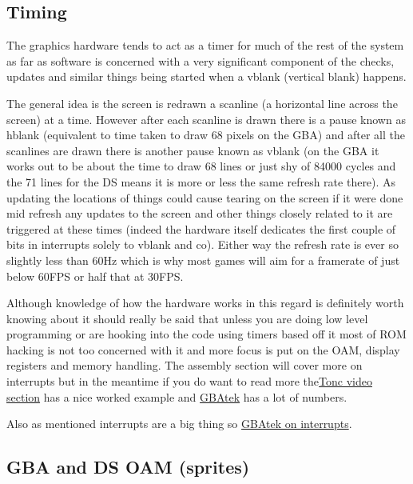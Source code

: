 \documentclass[
]{book}
\begin{document}
\hypertarget{timing}{%
\subsection{Timing}\label{timing}}

The graphics hardware tends to act as a timer for much of the rest of the system as far as software is concerned with a very significant component of the checks, updates and similar things being started when a vblank (vertical blank) happens.

The general idea is the screen is redrawn a scanline (a horizontal line across the screen) at a time. However after each scanline is drawn there is a pause known as hblank (equivalent to time taken to draw 68 pixels on the GBA) and after all the scanlines are drawn there is another pause known as vblank (on the GBA it works out to be about the time to draw 68 lines or just shy of 84000 cycles and the 71 lines for the DS means it is more or less the same refresh rate there). As updating the locations of things could cause tearing on the screen if it were done mid refresh any updates to the screen and other things closely related to it are triggered at these times (indeed the hardware itself dedicates the first couple of bits in interrupts solely to vblank and co). Either way the refresh rate is ever so slightly less than 60Hz which is why most games will aim for a framerate of just below 60FPS or half that at 30FPS.

Although knowledge of how the hardware works in this regard is definitely worth knowing about it should really be said that unless you are doing low level programming or are hooking into the code using timers based off it most of ROM hacking is not too concerned with it and more focus is put on the OAM, display registers and memory handling. The assembly section will cover more on interrupts but in the meantime if you do want to read more the\href{http://www.coranac.com/tonc/text/video.htm}{Tonc video section} has a nice worked example and \href{http://problemkaputt.de/gbatek.htm\#lcddimensionsandtimings}{GBAtek} has a lot of numbers.

Also as mentioned interrupts are a big thing so \href{http://problemkaputt.de/gbatek.htm\#gbainterruptcontrol}{GBAtek on interrupts}.

\hypertarget{gba-and-ds-oam-sprites}{%
\subsection{GBA and DS OAM (sprites)}\label{gba-and-ds-oam-sprites}}
\end{document}
